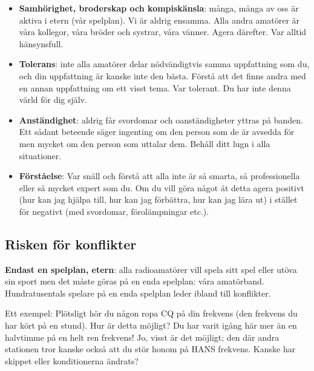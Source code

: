 \begin{itemize}
\item \textbf{Samhörighet, broderskap och kompiskänsla}: många, många av oss
  är aktiva i etern (vår spelplan). Vi är aldrig ensamma. Alla andra amatörer
  är våra kollegor, våra bröder och systrar, våra vänner. Agera därefter.
  Var alltid hänsynsfull.

\item \textbf{Tolerans}: inte alla amatörer delar nödvändigtvis samma
  uppfattning som du, och din uppfattning är kanske inte den bästa.
  Förstå att det finns andra med en annan uppfattning om ett visst tema.
  Var tolerant. Du har inte denna värld för dig själv.

\item \textbf{Anständighet}: aldrig får svordomar och oanständigheter yttras
  på banden. Ett sådant beteende säger ingenting om den person som de är
  avsedda för men mycket om den person som uttalar dem.
  Behåll ditt lugn i alla situationer.

\item \textbf{Förståelse}: Var snäll och förstå att alla inte är så smarta,
  så professionella eller så mycket expert som du. Om du vill göra något åt
  detta agera positivt (hur kan jag hjälpa till, hur kan jag förbättra,
  hur kan jag lära ut) i stället för negativt (med svordomar, förolämpningar
  etc.).
\end{itemize}

\subsection{Risken för konflikter}
\textbf{Endast en spelplan, etern}: alla radioamatörer vill spela sitt spel
eller utöva sin sport men det måste göras på en enda spelplan: våra amatörband.
Hundratusentals spelare på en enda spelplan leder ibland till konflikter.

Ett exempel: Plötsligt hör du någon ropa CQ på din frekvens (den frekvens du
har kört på en stund). Hur är detta möjligt? Du har varit igång här mer än en
halvtimme på en helt ren frekvens! Jo, visst är det möjligt; den där andra
stationen tror kanske också att du stör honom på HANS frekvens. Kanske har
skippet eller konditionerna ändrats?

